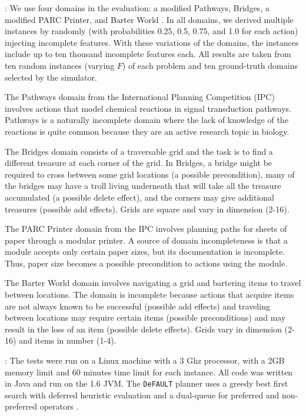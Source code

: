 \documentclass[letterpaper]{article}
\def\und#1{\noindent{\bf #1}:}
\def\citep#1{\cite{#1}}
\def\FFRISKY{{\tt DeFAULT}}
\begin{document}
\und{Domains} We use four domains in the evaluation: a modified Pathways,
Bridges,  a modified PARC Printer, and Barter World \citep{bryce-icaps11}.  In
all domains, we derived multiple instances by randomly (with probabilities 0.25,
0.5, 0.75, and 1.0 for each action) injecting incomplete  features.   
With these variations of the domains, the instances include up to ten thousand
incomplete  features each. All results are taken from ten random instances
(varying $F$) of each problem and ten ground-truth domains selected by the
simulator.

The Pathways  domain from the International Planning Competition  (IPC) involves actions that model chemical reactions in signal
transduction pathways.  Pathways is a naturally incomplete domain where the lack
of knowledge of the reactions is quite common because they are an active
research topic in biology.  

The Bridges  domain consists of a traversable grid and the task is to find a
different treasure at each corner of the grid. In Bridges,
a bridge might be required  to cross between some grid locations (a possible
precondition), many of the bridges may have a troll living
underneath that will take all the treasure accumulated (a possible delete
effect), and the corners may give additional treasures (possible add
effects).  Grids are square and vary in dimension (2-16).

The PARC Printer  domain from the IPC involves planning paths for sheets of
paper through a modular printer.  A source of domain incompleteness is that a module
accepts only certain paper sizes, but its documentation is incomplete.  Thus,
paper size becomes a possible precondition to actions using the module.

The Barter World  domain involves navigating a grid and bartering items to
travel between locations.  The domain is incomplete because actions that acquire
 items are not always known to be successful (possible add effects) and traveling between locations may require
certain items (possible preconditions) and may result in the loss of an item
(possible delete effects). Grids vary in dimension (2-16) and items
in number (1-4).





\und{Test Setup} The tests were run on a Linux machine with a 3 Ghz processor,
with a  2GB memory limit and 60 minutes time limit for each instance. All code
was written in Java and run on the 1.6 JVM. The \FFRISKY{} planner uses a greedy
best first search with deferred heuristic evaluation and a dual-queue for
preferred and non-preferred operators \citep{DBLP:journals/jair/Helmert06}. 
\end{document}
